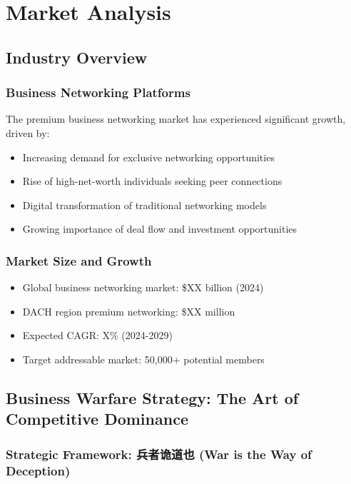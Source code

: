 \chapter{Market Analysis}

\section{Industry Overview}

\subsection{Business Networking Platforms}
The premium business networking market has experienced significant growth, driven by:
\begin{itemize}
    \item Increasing demand for exclusive networking opportunities
    \item Rise of high-net-worth individuals seeking peer connections
    \item Digital transformation of traditional networking models
    \item Growing importance of deal flow and investment opportunities
\end{itemize}

\subsection{Market Size and Growth}
\begin{itemize}
    \item Global business networking market: \$XX billion (2024)
    \item DACH region premium networking: \$XX million
    \item Expected CAGR: X\% (2024-2029)
    \item Target addressable market: 50,000+ potential members
\end{itemize}

\section{Business Warfare Strategy: The Art of Competitive Dominance}

\subsection{Strategic Framework: 兵者诡道也 (War is the Way of Deception)}

